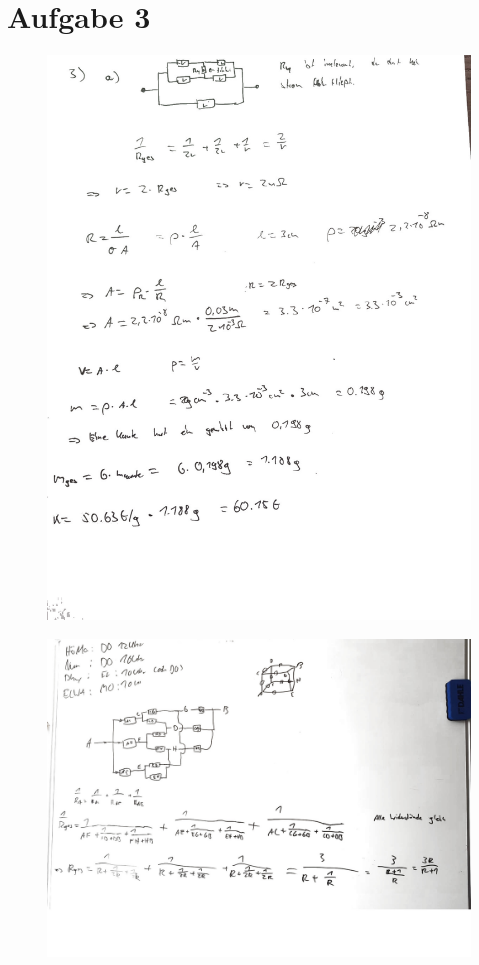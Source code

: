\documentclass[11pt a4paper]{article}
\begin{document}
\section*{Aufgabe 3}
\begin{figure}[H]
	\centering
	\includegraphics[width=15cm]{roman/3_1_cleaned.jpg}
\end{figure}
\newpage
\begin{figure}[H]
	\centering
	\includegraphics[width=15cm]{roman/3_2_cleaned.jpg}
\end{figure}
\end{document}
